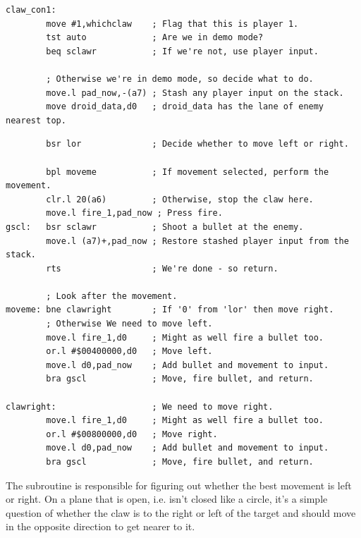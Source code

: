 \begin{lstlisting}
claw_con1:
        move #1,whichclaw    ; Flag that this is player 1. 
        tst auto             ; Are we in demo mode?
        beq sclawr           ; If we're not, use player input. 

        ; Otherwise we're in demo mode, so decide what to do. 
        move.l pad_now,-(a7) ; Stash any player input on the stack.
        move droid_data,d0   ; droid_data has the lane of enemy nearest top.
\end{lstlisting}
\begin{lstlisting}
        bsr lor              ; Decide whether to move left or right.

        bpl moveme           ; If movement selected, perform the movement.
        clr.l 20(a6)         ; Otherwise, stop the claw here.
        move.l fire_1,pad_now ; Press fire.
gscl:   bsr sclawr           ; Shoot a bullet at the enemy.
        move.l (a7)+,pad_now ; Restore stashed player input from the stack.
        rts                  ; We're done - so return.
    
        ; Look after the movement. 
moveme: bne clawright        ; If '0' from 'lor' then move right.
        ; Otherwise We need to move left.
        move.l fire_1,d0     ; Might as well fire a bullet too.
        or.l #$00400000,d0   ; Move left.
        move.l d0,pad_now    ; Add bullet and movement to input.
        bra gscl             ; Move, fire bullet, and return.

clawright:                   ; We need to move right.
        move.l fire_1,d0     ; Might as well fire a bullet too. 
        or.l #$00800000,d0   ; Move right.
        move.l d0,pad_now    ; Add bullet and movement to input.
        bra gscl             ; Move, fire bullet, and return.
\end{lstlisting}

The  subroutine is responsible for figuring out whether the best movement is left or right. On
a plane that is open, i.e. isn't closed like a circle, it's a simple question
of whether the claw is to the right or left of the target and should move
in the opposite direction to get nearer to it. 

